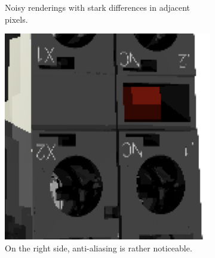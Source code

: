 \begin{figure}[H]
\begin{subfigure}[t]{0.3\textwidth}
        \caption{Noisy renderings with stark differences in adjacent pixels.}
        \label{fig:rngNoiseArtifactsHighlightsGoodNoisy}
    \end{subfigure}
    \hspace*{2cm}
    \vfill
    \vspace*{0.5cm}
    \hspace*{2cm}
    \begin{subfigure}[t]{0.3\textwidth}
        \includegraphics[width=\textwidth]{resources/bad-seed-anti-aliasing.png}
        \caption{On the right side, anti-aliasing is rather noticeable.}
        \label{fig:rngNoiseArtifactsHighlightsBadAnti}
    \end{subfigure}
    \hfill
    \begin{subfigure}[t]{0.3\textwidth}

\end{subfigure}
\end{figure}
